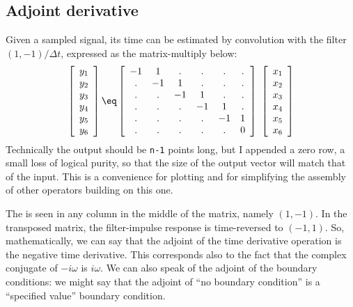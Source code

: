\subsection{Adjoint derivative}
Given a sam\-pled sig\-nal,
its time  can be esti\-mated
by con\-vo\-lu\-tion with the fil\-ter $(1,-1)/\Delta t$,
expressed as the matrix-multiply below:
\begin{equation}
\left[ \begin{array}{c}
	y_1 \\
	y_2 \\
	y_3 \\
	y_4 \\
	y_5 \\
	y_6
	\end{array} \right]
\eq
\left[ \begin{array}{cccccc}
	-1& 1& .& .& .& . \\
	 .&-1& 1& .& .& . \\
	 .& .&-1& 1& .& . \\
	 .& .& .&-1& 1& . \\
	 .& .& .& .&-1& 1 \\
	 .& .& .& .& .& 0
	\end{array} \right] \ 
\left[ \begin{array}{c}
	x_1 \\
	x_2 \\
	x_3 \\
	x_4 \\
	x_5 \\
	x_6
	\end{array} \right]
 \label{eqn:ruff1}
\end{equation}
Technically the output should be {\tt n-1} points long,
but I appended a zero row,
a small loss of logical purity,
so that the size of the output vector will match that of the input.
This is a convenience for plotting
and for simplifying the assembly of other operators building on this one.
\par
The  is seen in any column
in the middle of the matrix, namely $(1,-1)$. 
In the transposed matrix,
the filter-impulse response
is time-reversed to $(-1,1)$.
So, mathematically,
we can say that the adjoint of the time derivative operation
is the negative time derivative.
This corresponds also to the fact that
the complex conjugate of $-i\omega$ is $i\omega$.
We can also speak of the adjoint of the boundary conditions:
we might say that the adjoint of ``no boundary condition''
is a ``specified value'' boundary condition.
\par
